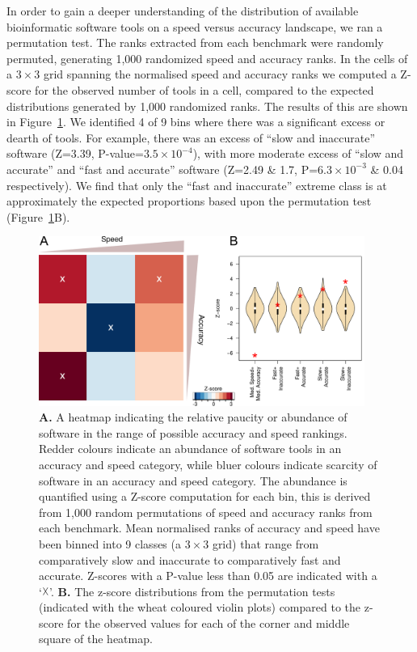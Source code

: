 \documentclass{bmcart}
\begin{document}
In order to gain a deeper understanding of the distribution of
available bioinformatic software tools on a speed versus accuracy
landscape, we ran a permutation test. The ranks extracted
from each benchmark were randomly permuted, generating 1,000
randomized speed and accuracy ranks. In the cells of a $3\times3$
grid spanning the normalised speed and accuracy ranks we computed a
Z-score for the observed number of tools in a cell, compared to the
expected distributions generated by 1,000 randomized ranks. The results
of this are shown in Figure~\ref{fig:speedaccuracy}. We identified 4
of 9 bins where there was a significant excess or dearth of tools. For
example, there was an excess of ``slow and inaccurate'' software (Z=3.39,
P-value=$3.5\times 10^{-4}$), with more moderate excess of ``slow and accurate'' and ``fast and accurate'' software (Z=2.49 \& 1.7, P=$6.3\times 10^{-3}$ \& 0.04 respectively). We find that only the ``fast and inaccurate'' extreme class is at approximately the
expected proportions based upon the permutation test (Figure~\ref{fig:speedaccuracy}B).


\begin{figure}[htb!]
\centering
\includegraphics[width=0.95\textwidth]{figure2.pdf}
\caption{\textbf{A.} A heatmap indicating the relative paucity or abundance of
  software in the range of possible accuracy and speed rankings. Redder
  colours indicate an abundance of software tools in an accuracy and
  speed category, while bluer colours indicate scarcity of software in
  an accuracy and speed category. The abundance is quantified using a
  Z-score computation for each bin, this is derived from 1,000 random
  permutations of speed and accuracy ranks from each
  benchmark. Mean normalised ranks of accuracy and speed have been
  binned into 9 classes (a $3\times 3$ grid) that range from
  comparatively slow and inaccurate to comparatively
  fast and accurate. Z-scores with a P-value less than 0.05 are indicated
  with a ‘$\vartimes$’. \textbf{B.} The z-score distributions from the permutation tests (indicated with the wheat coloured violin plots) compared to 
  the z-score for the observed values for each of the corner and middle square of the heatmap.}
\label{fig:speedaccuracy}
\end{figure}
\end{document}
